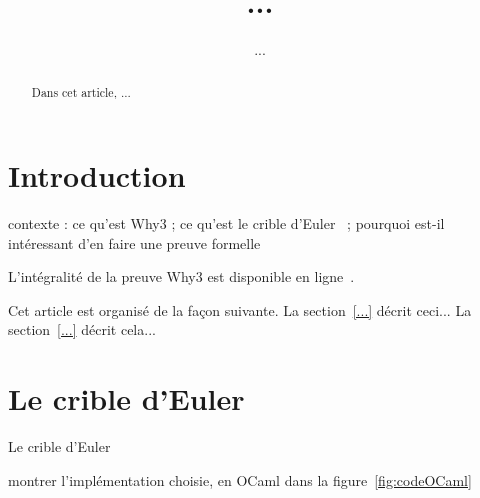 \documentclass[a4paper]{easychair}
\begin{document}
\title{...}
\author{...}
\maketitle

\begin{abstract}
  Dans cet article, ...
\end{abstract}

\section{Introduction}

contexte : ce qu'est Why3 ; ce qu'est le crible d'Euler~\cite{crible-euler} ; pourquoi
est-il intéressant d'en faire une preuve formelle

L'intégralité de la preuve Why3 est disponible en ligne~\cite{mapreuve}.

Cet article est organisé de la façon suivante.
La section~\ref{...} décrit ceci...
La section~\ref{...} décrit cela...

\section{Le crible d'Euler}

Le crible d'Euler~\cite{crible-euler}

montrer l'implémentation choisie, en OCaml
dans la figure~\ref{fig:codeOCaml}
\end{document}
